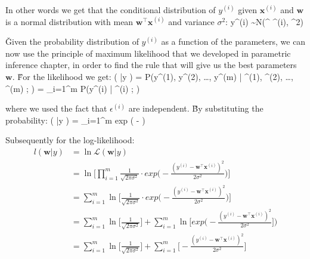 In other words we get that the conditional distribution of $y^{(i)}$ given $\boldsymbol{x}^{(i)}$ and
$\boldsymbol{w}$ is a normal distribution with mean $\boldsymbol{w}^{\intercal} \boldsymbol{x}^{(i)}$ and variance
$\sigma^2$:
\bse
y^{(i)} \sim N(^{\intercal} ^{(i)}, \sigma^2)
\ese

\v

Given the probability distribution of $y^{(i)}$ as a function of the parameters, we can now use the principle of
maximum likelihood that we developed in parametric inference chapter, in order to find the rule that will give us the
best parameters $\boldsymbol{w}$. \v

For the likelihood we get:
\bse
{} ( |y ) = P(y^{(1)}, y^{(2)}, \ldots, y^{(m)} | ^{(1)}, ^{(2)},
\ldots, ^{(m)} ; ) = \prod_{i=1}^{m} P(y^{(i)} | ^{(i)} ; )
\ese

where we used the fact that $\epsilon^{(i)}$ are independent. \v

By substituting the probability:
\bse
{} ( |y ) = \prod_{i=1}^{m}  \cdot exp \Big( -  \Big)
\ese

Subsequently for the log-likelihood:
{\setlength{\jot}{10pt}
\begin{align*}
l (\boldsymbol{w} |y ) &= \ln \mathcal{L} (\boldsymbol{w} |y ) \\
&= \ln \Big[ \prod_{i=1}^{m} \frac{1}{\sqrt{2 \pi \sigma^2}} \cdot
exp \Big( - \frac{(y^{(i)} - \boldsymbol{w}^{\intercal} \boldsymbol{x}^{(i)})^2}{2 \sigma^2} \Big) \Big] \\
&= \sum_{i=1}^{m} \ln \Big[ \frac{1}{\sqrt{2 \pi \sigma^2}} \cdot
exp \Big( - \frac{(y^{(i)} - \boldsymbol{w}^{\intercal} \boldsymbol{x}^{(i)})^2}{2 \sigma^2} \Big) \Big] \\
&= \sum_{i=1}^{m} \ln \Big[ \frac{1}{\sqrt{2 \pi \sigma^2}} \Big] + \sum_{i=1}^{m}
\ln \Big[ exp \Big( - \frac{(y^{(i)} - \boldsymbol{w}^{\intercal} \boldsymbol{x}^{(i)})^2}{2 \sigma^2} \Big] \Big) \\
&= \sum_{i=1}^{m} \ln \Big[ \frac{1}{\sqrt{2 \pi \sigma^2}} \Big] +
\sum_{i=1}^{m} \Big[ - \frac{(y^{(i)} - \boldsymbol{w}^{\intercal} \boldsymbol{x}^{(i)})^2}{2 \sigma^2} \Big]
\end{align*}}

